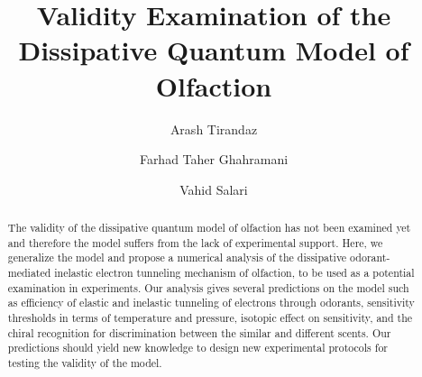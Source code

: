 \documentclass[aps,prl,tightenlines,onecolumn,superscriptaddress]{revtex4}
\begin{document}
\title{Validity Examination of the Dissipative Quantum Model of Olfaction}
\author{Arash Tirandaz}
\author{Farhad Taher Ghahramani}
\author{Vahid Salari}

\begin{abstract}
  The validity of the dissipative quantum model of olfaction has not been examined yet and therefore the model suffers from the lack of experimental support. Here, we generalize the model and propose a numerical analysis of the dissipative odorant-mediated inelastic electron tunneling mechanism of olfaction, to be used as a potential examination in experiments. Our analysis gives several predictions on the model such as efficiency of elastic and inelastic tunneling of electrons through odorants, sensitivity thresholds in terms of temperature and pressure, isotopic effect on sensitivity, and the chiral recognition for discrimination between the similar and different scents. Our predictions should yield new knowledge to design new experimental protocols for testing the validity of the model.
\end{abstract}

\maketitle
\end{document}

